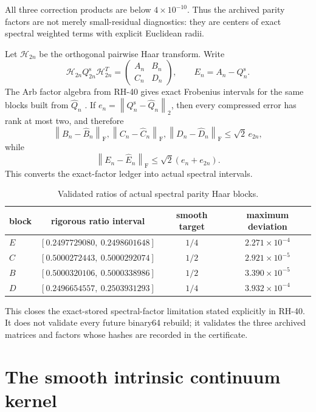 \documentclass[11pt]{article}
\theoremstyle{definition}
\theoremstyle{remark}
\newcommand{\C}{\mathbb C}
\newcommand{\norm}[1]{\left\lVert #1\right\rVert}
\begin{document}
All three correction products are below $4\times10^{-10}$.  Thus the
archived parity factors are not merely small-residual diagnostics: they are
centers of exact spectral weighted terms with explicit Euclidean radii.

Let $\mathscr H_{2n}$ be the orthogonal pairwise Haar transform.  Write
\[
 \mathscr H_{2n}Q_{2n}^{\mathrm s}\mathscr H_{2n}^T
 =\begin{pmatrix}A_n&B_n\\C_n&D_n\end{pmatrix},
 \qquad
 E_n=A_n-Q_n^{\mathrm s}.
\]
The Arb factor algebra from RH-40 gives exact Frobenius intervals for the
same blocks built from $\widehat Q_n$ \citep{Johansson2017,WangRiesz2026}.
If $e_n=\norm{Q_n^{\mathrm s}-\widehat Q_n}_2$, then every compressed error
has rank at most two, and therefore
\[
 \norm{B_n-\widehat B_n}_{\mathrm F},
 \norm{C_n-\widehat C_n}_{\mathrm F},
 \norm{D_n-\widehat D_n}_{\mathrm F}
 \le\sqrt2\,e_{2n},
\]
while
\[
 \norm{E_n-\widehat E_n}_{\mathrm F}
 \le\sqrt2(e_n+e_{2n}).
\]
This converts the exact-factor ledger into actual spectral intervals.

\begin{table}[H]
\centering
\caption{Validated ratios of actual spectral parity Haar blocks.}
\label{tab:haar-ratios}
\begin{tabular}{@{}lccc@{}}
\toprule
block & rigorous ratio interval & smooth target & maximum deviation\\
\midrule
$E$ & $[0.2497729080,\ 0.2498601648]$ & $1/4$ & $2.271\times10^{-4}$\\
$C$ & $[0.5000272443,\ 0.5000292074]$ & $1/2$ & $2.921\times10^{-5}$\\
$B$ & $[0.5000320106,\ 0.5000338986]$ & $1/2$ & $3.390\times10^{-5}$\\
$D$ & $[0.2496654557,\ 0.2503931293]$ & $1/4$ & $3.932\times10^{-4}$\\
\bottomrule
\end{tabular}
\end{table}

This closes the exact-stored spectral-factor limitation stated explicitly in
RH-40.  It does not validate every future binary64 rebuild; it validates the
three archived matrices and factors whose hashes are recorded in the
certificate.

\section{The smooth intrinsic continuum kernel}
\label{sec:kernel}
\end{document}

